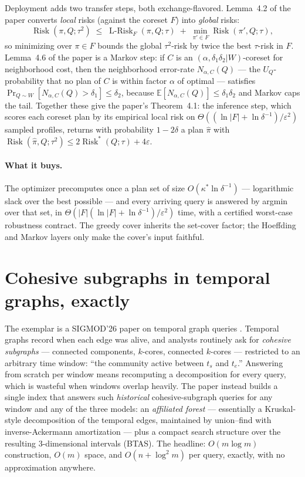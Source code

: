 Deployment adds two transfer steps, both exchange-flavored. Lemma~4.2 of the paper
converts \emph{local} risks (against the coreset $F$) into \emph{global} risks:
\[
\operatorname{Risk}(\pi,Q;\tau^{2}) \;\le\;
\operatorname{L-Risk}_{F}(\pi,Q;\tau) \;+\;
\min_{\pi'\in F}\operatorname{Risk}(\pi',Q;\tau),
\]
so minimizing over $\pi\in F$ bounds the global $\tau^{2}$-risk by twice the best
$\tau$-risk in $F$. Lemma~4.6 of the paper is a Markov step: if $C$ is an
$(\alpha,\delta_1\delta_2|W)$-coreset for neighborhood cost, then the neighborhood
error-rate $N_{\alpha,C}(Q)$ --- the $U_Q$-probability that no plan of $C$ is within
factor $\alpha$ of optimal --- satisfies $\Pr_{Q\sim W}[N_{\alpha,C}(Q)>\delta_1]
\le\delta_2$, because $\mathbb{E}[N_{\alpha,C}(Q)]\le\delta_1\delta_2$ and Markov caps
the tail. Together these give the paper's Theorem~4.1: the inference step, which
scores each coreset plan by its empirical local risk on
$\Theta((\ln|F|+\ln\delta^{-1})/\varepsilon^{2})$ sampled profiles, returns with
probability $1-2\delta$ a plan $\hat{\pi}$ with
$\operatorname{Risk}(\hat{\pi},Q;\tau^{2}) \le 2\operatorname{Risk}^{*}(Q;\tau)+4\varepsilon$.

\paragraph{What it buys.}
The optimizer precomputes once a plan set of size $O(\kappa^{*}\ln\delta^{-1})$ ---
logarithmic slack over the best possible --- and every arriving query is answered by
argmin over that set, in $\Theta(|F|(\ln|F|+\ln\delta^{-1})/\varepsilon^{2})$ time,
with a certified worst-case robustness contract. The greedy cover inherits the
set-cover factor; the Hoeffding and Markov layers only make the cover's input
faithful.

\section{Cohesive subgraphs in temporal graphs, exactly}
\label{sec:exc-200}

The exemplar is a SIGMOD'26 paper on temporal graph queries \citep{sigmod26-200}.
Temporal graphs record when each edge was alive, and analysts routinely ask for
\emph{cohesive subgraphs} --- connected components, $k$-cores, connected $k$-cores ---
restricted to an arbitrary time window: ``the community active between $t_s$ and
$t_e$.'' Answering from scratch per window means recomputing a decomposition for
every query, which is wasteful when windows overlap heavily. The paper instead builds
a single index that answers such \emph{historical} cohesive-subgraph queries for any
window and any of the three models: an \emph{affiliated forest} --- essentially a
Kruskal-style decomposition of the temporal edges, maintained by union--find with
inverse-Ackermann amortization --- plus a compact search structure over the resulting
3-dimensional intervals (BTAS). The headline: $O(m\log m)$ construction, $O(m)$ space,
and $O(n+\log^{2}m)$ per query, exactly, with no approximation anywhere.

